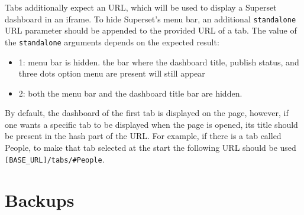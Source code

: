 \documentclass[
]{book}
\providecommand{\tightlist}{%
  \setlength{\itemsep}{0pt}\setlength{\parskip}{0pt}}
\begin{document}
Tabs additionally expect an URL, which will be used to display a Superset dashboard in an iframe.
To hide Superset's menu bar, an additional \texttt{standalone} URL parameter should be appended to the provided URL of a tab.
The value of the \texttt{standalone} arguments depends on the expected result:

\begin{itemize}
\tightlist
\item
  1: menu bar is hidden. the bar where the dashboard title, publish status, and three dots option menu are present will still appear
\item
  2: both the menu bar and the dashboard title bar are hidden.
\end{itemize}

By default, the dashboard of the first tab is displayed on the page, however, if one wants a specific tab to be displayed when the page is opened, its title should be present in the hash part of the URL.
For example, if there is a tab called People, to make that tab selected at the start the following URL should be used \texttt{{[}BASE\_URL{]}/tabs/\#People}.

\hypertarget{backups}{%
\chapter{Backups}\label{backups}}
\end{document}
